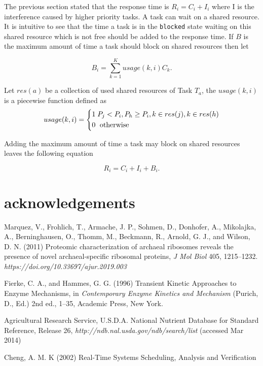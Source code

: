 \documentclass[10pt]{article}
\begin{document}
The previous section stated that the response time is $R_i = C_i + I_i$ where I is the interference caused by higher priority tasks.
A task can wait on a shared resource. It is intuitive to see that the time a task is in the \texttt{blocked} state waiting on this shared resource which is not free should be added to the response time.
If $B$ is the maximum amount of time a task should block on shared resources then let

\begin{equation}
    B_i = \sum_{k = 1}^{K} usage(k,i) C_k.
\end{equation}

Let $res(a)$ be a collection of used shared resources of Task $T_a$, the $usage(k,i)$ is a piecewise function defined as 
\[
    usage(k,i) = 
    \begin{dcases}
        1 \;  P_j < P_i, P_h \geq P_i, k \in res(j), k \in res(h) \\
        0 \;  \text{ otherwise }
    \end{dcases}
\]

Adding the maximum amount of time a task may block on shared resources leaves the following equation 

\begin{equation}
    R_i = C_i + I_i + B_i.
\end{equation}



\section*{acknowledgements}

\begin{thebibliography}{9} %

 Marquez, V., Frohlich, T., Armache, J. P., Sohmen, D., Donhofer, A., Mikolajka, A., Berninghausen, O., Thomm, M., Beckmann, R., Arnold, G. J., and Wilson, D. N. (2011) Proteomic characterization of archaeal ribosomes reveals the presence of novel archaeal-specific ribosomal proteins, \textit{J Mol Biol} 405, 1215--1232. \textit {https://doi.org/10.33697/ajur.2019.003}

 Fierke, C. A., and Hammes, G. G. (1996) Transient Kinetic Approaches to Enzyme Mechanisms, in \textit{Contemporary Enzyme Kinetics and Mechanism} (Purich, D., Ed.) 2nd ed., 1--35, Academic Press, New York.

 Agricultural Research Service, U.S.D.A. National Nutrient Database for Standard Reference, Release 26, \textit{http://ndb.nal.usda.gov/ndb/search/list} (accessed Mar 2014)

 Cheng, A. M. K (2002) Real-Time Systems Scheduling, Analysis and Verification

\end{thebibliography}
\end{document}
